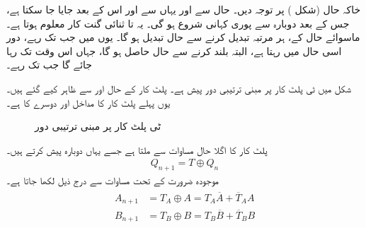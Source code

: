 خاکہ حال (شکل ) پر توجہ دیں۔ حال  سے  اور یہاں سے  اور اس کے بعد  جایا جا سکتا ہے، جس کے بعد دوبارہ  سے پوری کہانی شروع ہو گی۔ یہ  تا  ثنائی گنت کار معلوم ہوتا ہے۔ ماسوائے حال  کے، ہر مرتبہ  تبدیل کرنے سے حال تبدیل ہو گا۔ یوں  میں جب تک  رہے، دور اسی حال میں رہتا ہے، البتہ  بلند کرنے سے  حال حاصل ہو گا، جہاں اس وقت تک رہا جائے گا جب تک  رہے۔



شکل  میں ٹی پلٹ کار پر مبنی ترتیبی دور پیش ہے۔ پلٹ کار کے حال  اور  سے ظاہر کیے گئے ہیں۔یوں پہلے پلٹ کار کا مداخل  اور دوسرے کا  ہے۔
\begin{figure}
\centering
{}
\caption{ٹی پلٹ کار پر مبنی ترتیبی دور}
\label{شکل_ترتیبی_ٹی_پلٹ_ترتیبی_مثال}
\end{figure}

پلٹ کار کا اگلا حال مساوات  سے ملتا ہے جسے یہاں دوبارہ پیش کرتے ہیں۔
\begin{align*}
Q_{n+1}=T\oplus Q_n
\end{align*}
موجودہ ضرورت کے تحت مساوات سے درج ذیل لکھا جاتا ہے۔
\begin{gather}
\begin{aligned}\label{مساوات_ترتیبی_ٹی_مثال_حال}
A_{n+1}&=T_A\oplus A=T_A \overline{A}+\overline{T}_AA\\
B_{n+1}&=T_B\oplus B=T_B\overline{B}+\overline{T}_BB
\end{aligned}
\end{gather}

